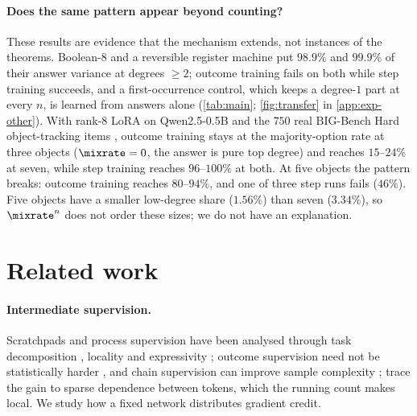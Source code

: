 \paragraph{Does the same pattern appear beyond counting?} These results are evidence that the mechanism extends, not instances of the theorems.
Boolean-8 and a reversible register machine put $98.9\%$ and $99.9\%$ of their answer variance at degrees $\ge2$; outcome
training fails on both while step training succeeds, and a first-occurrence control, which keeps a degree-$1$ part at
every $n$, is learned from answers alone (\cref{tab:main}; \cref{fig:transfer} in \cref{app:exp-other}). With rank-8 LoRA on Qwen2.5-0.5B and the
$750$ real BIG-Bench Hard object-tracking items \citep{suzgun2022challenging}, outcome training stays at the
majority-option rate at three objects ($\mixrate=0$, the answer is pure top degree) and reaches $15$--$24\%$ at seven, while
step training reaches $96$--$100\%$ at both. At five objects the pattern breaks: outcome training reaches $80$--$94\%$, and one
of three step runs fails ($46\%$). Five objects have a smaller low-degree share ($1.56\%$) than seven ($3.34\%$), so $\mixrate^n$
does not order these sizes; we do not have an explanation.


\section{Related work}
\label{sec:related}

\paragraph{Intermediate supervision.} Scratchpads and process supervision
\citep{nye2021scratchpads,uesato2022solving,wei2022cot,lightman2023verify} have been analysed through task decomposition
\citep{wies2023subtask}, locality \citep{prystawski2023think,abbe2024globality} and expressivity
\citep{feng2023towards,merrill2024expressive,malach2023autoregressive}; outcome supervision need not be statistically
harder \citep{jia2025verify}, and chain supervision can improve sample complexity
\citep{hanneke2026samplecomplexityautoregressivereasoning,wen2024sparse}; \citet{wen2024sparse} trace the gain to sparse
dependence between tokens, which the running count makes local. We study how a fixed network distributes gradient credit.

